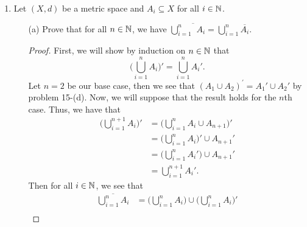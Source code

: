 \documentclass[a4paper]{article}
\begin{document}
\begin{enumerate}
\begin{proof}
        \( (\Longrightarrow) \) Suppose \( \overline{A} = X  \). By problem 11, we see that for any \( x \in X  \) and for all \( \epsilon > 0  \) that 
        \[  {N}_{\epsilon}(x) \cap A \neq \emptyset. \tag{1}  \]
        If \( E  \) is any nonempty open set, then let \( q \in E  \). Since \( q  \) is an interior point of \( E  \), there exists \( \delta > 0  \) such that \[ {N}_{\delta}(q) \subseteq E \tag{2}.  \]
        By (1) and (2), we must have that \( E \cap A \neq \emptyset \).
        \end{proof}
        \item Let \( (X,d) \) be a metric space and \( {A}_{i} \subseteq X \) for all \( i \in \mathbb{N} \). 
            \begin{enumerate}
                \item[(a)] Prove that for all \( n \in \mathbb{N}  \), we have \( \overline{\bigcup_{ i=1  }^{ n }  } {A}_{i} = \bigcup_{ i=1 }^{ n }  \overline{{A}_{i}}. \)
                    \begin{proof}
                    First, we will show by induction on \( n \in \mathbb{N}  \) that  
                    \[  \Big(  \bigcup_{ i=1  }^{ n } {A}_{i} \Big)' = \bigcup_{ i=1  }^{ n }  {A}_{i}'. \]
                    Let \( n = 2  \) be our base case, then we see that 
                    \( ({A}_{1} \cup {A}_{2})^{'} = {A}_{1}' \cup {A}_{2}' \) by problem 15-(d). Now, we will suppose that the result holds for the \( n \)th case. Thus, we have that 
                    \begin{align*}
                       \Big( \bigcup_{ i=1  }^{ n  + 1  } {A}_{i} \Big)'  &= \Big( \bigcup_{ i= 1  }^{ n }  {A}_{i} \cup {A}_{n+1}   \Big)' \\
                                                                          &= \Big( \bigcup_{ i=1  }^{ n }  {A}_{i} \Big)' \cup {A}_{n+1}' \\
                                                                          &= \Big( \bigcup_{ i=1  }^{ n }  {A}_{i}' \Big)  \cup {A}_{n+1}' \\  
                                                                          &= \bigcup_{ i = 1  }^{ n + 1  } {A}_{i}'.
                    \end{align*}
                    Then for all \( i \in \mathbb{N}  \), we see that 
                    \begin{align*}
                        \overline{\bigcup_{ i=1  }^{ n }  {A}_{i}} &= \Big(  \bigcup_{ i =1  }^{ n }  {A}_{i} \Big) \cup \Big(  \bigcup_{ i=1 }^{ n } {A}_{i} \Big)' \\

\end{align*}
\end{proof}
\end{enumerate}
\end{enumerate}
\end{document}
